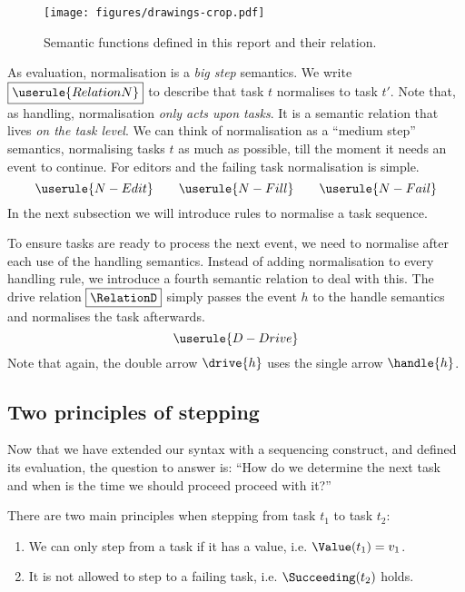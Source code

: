 \begin{figure}
  \centering
  \texttt{[image: figures/drawings-crop.pdf]}
  \caption{Semantic functions defined in this report and their relation.}
  \label{fig:semantic-functions}
\end{figure}

As evaluation,
normalisation is a \emph{big step} semantics.
We write $\boxed{\userule{RelationN}}$ to describe that
task $t$ normalises to task $t'$.
Note that, as handling,
normalisation \emph{only acts upon tasks}.
It is a semantic relation that lives \emph{on the task level}.
We can think of normalisation as a \enquote{medium step} semantics,
normalising tasks $t$ as much as possible,
till the moment it needs an event to continue.
For editors and the failing task normalisation is simple.
\begin{equation*}
  \userule{N-Edit} \qquad \userule{N-Fill} \qquad \userule{N-Fail}
\end{equation*}
In the next subsection we will introduce rules to normalise a task sequence.

To ensure tasks are ready to process the next event,
we need to normalise after each use of the handling semantics.
Instead of adding normalisation to every handling rule,
we introduce a fourth semantic relation to deal with this.
The drive relation $\boxed{\RelationD}$ simply passes the event $h$ to the handle semantics
and normalises the task afterwards.
\begin{equation*}
  \userule{D-Drive}
\end{equation*}
Note that again,
the double arrow $\drive{h}$ uses the single arrow $\handle{h}$.



\subsection{Two principles of stepping}
\label{sec:normalise-sequence}

Now that we have extended our syntax with a sequencing construct,
and defined its evaluation,
the question to answer is:
\enquote{How do we determine the next task
and when is the time we should proceed proceed with it?}

There are two main principles when stepping from task $t_1$ to task $t_2$:
\begin{enumerate}[S1]
  \item We can only step from a task if it has a value, i.e. $\Value(t_1) = v_1$.
  \item It is not allowed to step to a failing task, i.e. $\Succeeding(t_2)$ holds.
\end{enumerate}

